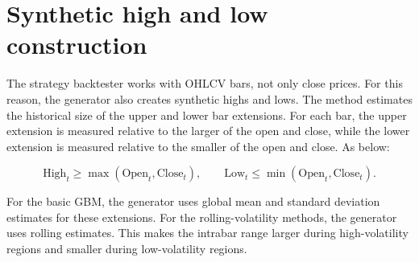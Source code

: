 \section{Synthetic high and low construction}

The strategy backtester works with OHLCV bars, not only close prices. For this reason, the generator
also creates synthetic highs and lows. The method estimates the historical size of the upper and
lower bar extensions. For each bar, the upper extension is measured relative to the larger of the
open and close, while the lower extension is measured relative to the smaller of the open and close.
As below:

\[
\text{High}_t \geq \max(\text{Open}_t, \text{Close}_t),
\qquad
\text{Low}_t \leq \min(\text{Open}_t, \text{Close}_t).
\]

For the basic GBM, the generator uses global mean and standard deviation estimates for these
extensions. For the rolling-volatility methods, the generator uses rolling estimates. This makes the
intrabar range larger during high-volatility regions and smaller during low-volatility regions.
